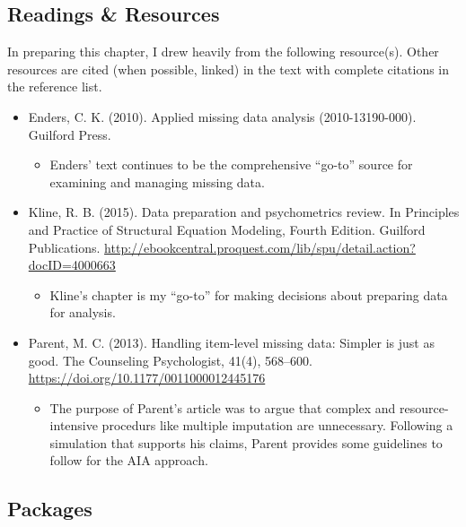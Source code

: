 \documentclass[
  11pt,
]{book}
\providecommand{\tightlist}{%
  \setlength{\itemsep}{0pt}\setlength{\parskip}{0pt}}
\begin{document}
\hypertarget{readings-resources-1}{%
\subsection{Readings \& Resources}\label{readings-resources-1}}

In preparing this chapter, I drew heavily from the following resource(s). Other resources are cited (when possible, linked) in the text with complete citations in the reference list.

\begin{itemize}
\tightlist
\item
  Enders, C. K. (2010). Applied missing data analysis (2010-13190-000). Guilford Press.

  \begin{itemize}
  \tightlist
  \item
    Enders' text continues to be the comprehensive ``go-to'' source for examining and managing missing data.
  \end{itemize}
\item
  Kline, R. B. (2015). Data preparation and psychometrics review. In Principles and Practice of Structural Equation Modeling, Fourth Edition. Guilford Publications. \url{http://ebookcentral.proquest.com/lib/spu/detail.action?docID=4000663}

  \begin{itemize}
  \tightlist
  \item
    Kline's chapter is my ``go-to'' for making decisions about preparing data for analysis.
  \end{itemize}
\item
  Parent, M. C. (2013). Handling item-level missing data: Simpler is just as good. The Counseling Psychologist, 41(4), 568--600. \url{https://doi.org/10.1177/0011000012445176}

  \begin{itemize}
  \tightlist
  \item
    The purpose of Parent's article was to argue that complex and resource-intensive procedurs like multiple imputation are unnecessary. Following a simulation that supports his claims, Parent provides some guidelines to follow for the AIA approach.
  \end{itemize}
\end{itemize}

\hypertarget{packages-1}{%
\subsection{Packages}\label{packages-1}}
\end{document}
